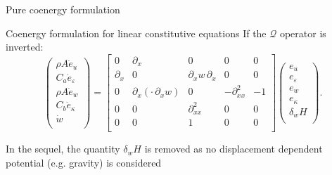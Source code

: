 \documentclass[serif]{beamer} %
\begin{document}
\begin{frame}{Pure coenergy formulation}
	
	\begin{block}{Coenergy formulation for linear constitutive equations}
		If the $\mathcal{Q}$ operator is inverted:
		\begin{equation*}
			\begin{pmatrix}
				\rho A \dot{e}_u \\
				C_a \dot{e}_\varepsilon \\
				\rho A \dot{e}_w \\
				C_b \dot{e}_\kappa \\
				\dot{w} \\
			\end{pmatrix} = 
			\begin{bmatrix}
				0 & \partial_x & 0 & 0 & 0\\
				\partial_x & 0 & \partial_x w \, \partial_x & 0 & 0 \\
				0 & \partial_x(\cdot \, \partial_x w) & 0 & -\partial_{xx}^2 & -1 \\
				0 & 0 & \partial_{xx}^2 & 0 & 0 \\ 
				0 & 0 & 1 & 0 & 0 \\
			\end{bmatrix}
			\begin{pmatrix}
				e_u \\
				e_\varepsilon \\
				e_w \\
				e_\kappa \\
				\delta_w H \\
			\end{pmatrix}.
		\end{equation*}
	\end{block}
In the sequel, the quantity $\delta_w H$ is removed as no displacement dependent potential (e.g. gravity) is considered
	
\end{frame}
\end{document}
